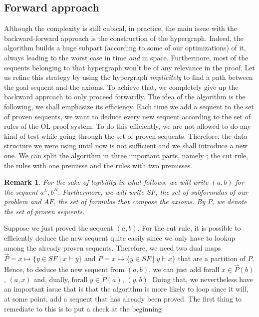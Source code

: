 \documentclass[a4paper, 11pt]{article}
\newtheorem*{remark}{Remark}
\begin{document}
    \subsection{Forward approach}
    Although the complexity is still cubical, in practice, the main issue with the backward-forward 
    approach is the construction of the hypergraph. Indeed,
    the algorithm builds a huge subpart (according to some of our optimizations) of it, always leading 
    to the worst case in time \textit{and} in space. Furthermore, most of the sequents belonging to 
    that hypergraph won't be of any relevance in the proof. Let us refine this strategy by using the
    hypergraph \textit{implicitely} to find a path between the goal sequent and the axioms. To achieve
    that, we completely give up the backward approach to only proceed forwardly. 
    The idea of the algorithm is the following, we shall emphasize its efficiency.
    Each time we add a sequent to the set of proven sequents, we want to deduce every new sequent
    according to the set of rules of the OL proof system.
    To do this efficiently, we are not allowed to do any kind of test while going through the set of
    proven sequents. Therefore, the data structure we were using until now is not sufficient
    and we shall introduce a new one. We can split the algorithm in three important parts, namely ;
    the cut rule, the rules with one premisse and the rules with two premisses. 
    \begin{remark}
	For the sake of legibility in what follows, we will write $(a,b)$ for the sequent $a^L,b^R$. 
	    Furthermore,
	    we will write $SF$, the set of subformulas of our problem and $AF$, the set of formulas
	    that compose the axioms. By $P$, we denote the set of proven sequents.
    \end{remark} 
    Suppose we just proved the sequent $(a,b)$. For the cut rule,
    it is possible to efficiently deduce the new sequent quite easily since we only have to
    lookup among the already proven sequents. Therefore, we need two dual maps 
    $\overrightarrow{P}=x\mapsto\{y\in SF\mid x\vdash y\}$ and
    $\overleftarrow{P}=x\mapsto\{y\in SF\mid y\vdash x\}$ that are a partition of $P$. Hence, to deduce
    the new sequent from $(a,b)$, we can just add forall $x\in\overrightarrow{P}(b)$, $(a,x)$ and,
    dually, forall $y\in\overleftarrow{P}(a)$, $(y,b)$. Doing that, we nevertheless have an important
    issue that is that the algorithm is more likely to loop since it will, at some point, add a sequent
    that has already been proved. The first thing to remediate to this is to put a check at the beginning
\end{document}
